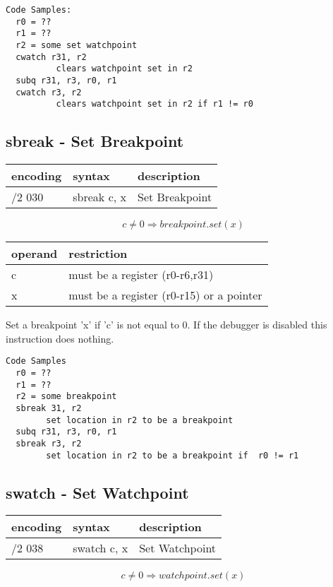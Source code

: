 \documentclass[letterpaper,10pt,openright,twoside,onecolumn]{book}
\begin{document}
  \begin{verbatim}
Code Samples:
  r0 = ??
  r1 = ??
  r2 = some set watchpoint
  cwatch r31, r2
          clears watchpoint set in r2
  subq r31, r3, r0, r1
  cwatch r3, r2
          clears watchpoint set in r2 if r1 != r0
  \end{verbatim}
\newpage\subsection{sbreak - Set Breakpoint}
  \begin{tabular}{|l|l|l|}
   \hline
    encoding & syntax & description \\
   \hline
    /2 030 & sbreak c, x & Set Breakpoint \\
   \hline
  \end{tabular}

  \begin{displaymath} c \neq 0 \Rightarrow breakpoint.set(x)\end{displaymath}

  \flushleft
  \begin{tabular}{|l|l|}
   \hline
    operand & restriction \\
   \hline
    c & must be a register (r0-r6,r31) \\
    x & must be a register (r0-r15) or a pointer \\
   \hline
  \end{tabular}

  Set a breakpoint 'x' if 'c' is not equal to 0.  If the debugger is disabled this
  instruction does nothing.

  \begin{verbatim}
Code Samples
  r0 = ??
  r1 = ??
  r2 = some breakpoint
  sbreak 31, r2
        set location in r2 to be a breakpoint
  subq r31, r3, r0, r1
  sbreak r3, r2 
        set location in r2 to be a breakpoint if  r0 != r1
  \end{verbatim}
\newpage\subsection{swatch - Set Watchpoint}
  \begin{tabular}{|l|l|l|}
   \hline
    encoding & syntax & description \\
   \hline
    /2 038 & swatch c, x & Set Watchpoint \\
   \hline
  \end{tabular}

  \begin{displaymath} c \neq 0 \Rightarrow watchpoint.set(x)\end{displaymath}
\end{document}
